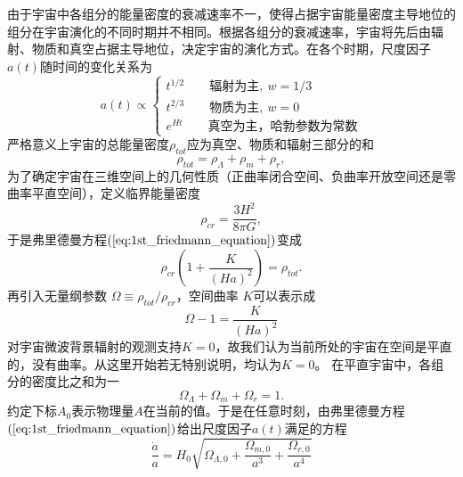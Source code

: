 由于宇宙中各组分的能量密度的衰减速率不一，使得占据宇宙能量密度主导地位的组分在宇宙演化的不同时期并不相同。根据各组分的衰减速率，宇宙将先后由辐射、物质和真空占据主导地位，决定宇宙的演化方式。在各个时期，尺度因子$a(t)$随时间的变化关系为
\begin{equation}
    a(t)\propto 
    \begin{cases}
        t^{1/2}\qquad \text{辐射为主},\ w=1/3 \\
        t^{2/3}\qquad \text{物质为主},\ w=0 \\
        e^{Ht}\qquad \text{真空为主，哈勃参数为常数}
    \end{cases}
\end{equation}
严格意义上宇宙的总能量密度$\rho_{tot}$应为真空、物质和辐射三部分的和
\begin{equation}
    \rho_{tot} = \rho_{\Lambda}+\rho_m+\rho_r,
\end{equation}
为了确定宇宙在三维空间上的几何性质（正曲率闭合空间、负曲率开放空间还是零曲率平直空间），定义临界能量密度 
\begin{equation}
    \label{eq:critical_rho}
    \rho_{cr} = \frac{3H^2}{8\pi G},
\end{equation}
于是弗里德曼方程$(\ref{eq:1st_friedmann_equation})$变成
\begin{equation}
    \rho_{cr}\left(1 + \frac{K}{{(Ha)}^2}\right) = \rho_{tot}.
\end{equation}
再引入无量纲参数 $\Omega\equiv
\rho_{tot}/\rho_{cr}$，空间曲率 $K$可以表示成
\begin{equation}\label{eq:flatness}
    \Omega - 1 = \frac{K}{{(Ha)}^2} 
\end{equation}
对宇宙微波背景辐射的观测支持$K=0$，故我们认为当前所处的宇宙在空间是平直的，没有曲率。从这里开始若无特别说明，均认为$K=0$。
在平直宇宙中，各组分的密度比之和为一
\begin{equation}
    \Omega_{\Lambda}+\Omega_m+\Omega_r=1.
\end{equation}
约定下标$A_0$表示物理量$A$在当前的值。于是在任意时刻，由弗里德曼方程$(\ref{eq:1st_friedmann_equation})$给出尺度因子$a(t)$满足的方程
\begin{equation}
    \frac{\dot{a}}{a} =
    H_0\sqrt{\Omega_{\Lambda,0}+\frac{\Omega_{m,0}}{a^3}+\frac{\Omega_{r,0}}{a^4}}
\end{equation}

